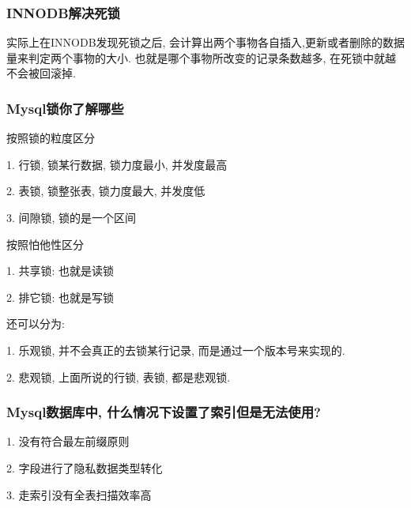 \subsubsection{INNODB解决死锁}
实际上在INNODB发现死锁之后, 会计算出两个事物各自插入,更新或者删除的数据量来判定两个事物的大小. 也就是哪个事物所改变的记录条数越多, 在死锁中就越不会被回滚掉.
\subsubsection{Mysql锁你了解哪些}
按照锁的粒度区分 \par
1. 行锁, 锁某行数据, 锁力度最小, 并发度最高 \par
2. 表锁, 锁整张表, 锁力度最大, 并发度低 \par
3. 间隙锁, 锁的是一个区间 \par
按照怕他性区分 \par
1. 共享锁: 也就是读锁 \par
2. 排它锁: 也就是写锁 \par
还可以分为: \par
1. 乐观锁, 并不会真正的去锁某行记录, 而是通过一个版本号来实现的. \par
2. 悲观锁, 上面所说的行锁, 表锁, 都是悲观锁. \par
\subsubsection{Mysql数据库中, 什么情况下设置了索引但是无法使用?}
1. 没有符合最左前缀原则 \par
2. 字段进行了隐私数据类型转化 \par
3. 走索引没有全表扫描效率高